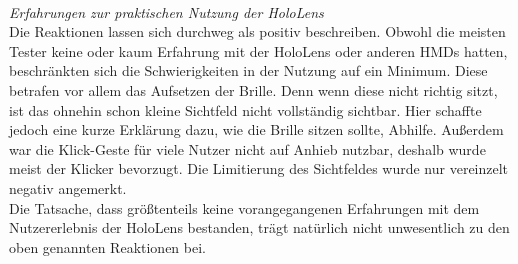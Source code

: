 \vspace{8px}
\begin{center}
	\\
\end{center}
\vspace{6px}

\textit{Erfahrungen zur praktischen Nutzung der HoloLens}\\
Die Reaktionen lassen sich durchweg als positiv beschreiben. Obwohl die meisten Tester keine oder kaum Erfahrung mit der HoloLens oder anderen HMDs hatten, beschränkten sich die Schwierigkeiten in der Nutzung auf ein Minimum. Diese betrafen vor allem das Aufsetzen der Brille. Denn wenn diese nicht richtig sitzt, ist das ohnehin schon kleine Sichtfeld nicht vollständig sichtbar. Hier schaffte jedoch eine kurze Erklärung dazu, wie die Brille sitzen sollte, Abhilfe. Außerdem war die Klick-Geste für viele Nutzer nicht auf Anhieb nutzbar, deshalb wurde meist der Klicker bevorzugt. Die Limitierung des Sichtfeldes wurde nur vereinzelt negativ angemerkt.\\

Die Tatsache, dass größtenteils keine vorangegangenen Erfahrungen mit dem Nutzererlebnis der HoloLens bestanden, trägt natürlich nicht unwesentlich zu den oben genannten Reaktionen bei.\\


